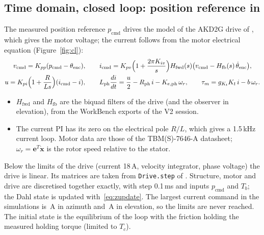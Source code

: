 \subsection{Time domain, closed loop: position reference in}\label{sec:cl}
The measured position reference $p_\mathrm{cmd}$ drives the model of the AKD2G drive of , which gives the motor voltage; the current follows from the motor electrical equation (Figure~\ref{fig:cl}):
\begin{gather}
v_\mathrm{cmd}=K_{pp}(p_\mathrm{cmd}-\theta_\mathrm{enc}),\qquad
i_\mathrm{cmd}=K_{pv}\Bigl(1+\frac{2\pi K_{iv}}{s}\Bigr)H_\mathrm{fwd}(s)\bigl(v_\mathrm{cmd}-H_\mathrm{fb}(s)\,\dot\theta_\mathrm{enc}\bigr),\\
u=K_{pi}\Bigl(1+\frac{R}{Ls}\Bigr)(i_\mathrm{cmd}-i),\qquad L_\mathrm{ph}\frac{di}{dt}=\frac u2-R_\mathrm{ph}\,i-K_{e,\mathrm{ph}}\,\omega_r,\qquad \tau_m=g_{K_t}K_t\,i-b\,\omega_r .\label{eq:drive}
\end{gather}
\begin{itemize}
\item $H_\mathrm{fwd}$ and $H_\mathrm{fb}$ are the biquad filters of the drive (and the observer in elevation), from the WorkBench exports of the V2 session.
\item The current PI has its zero on the electrical pole $R/L$, which gives a 1.5\,kHz current loop. Motor data are those of the TBM(S)-7646-A datasheet; $\omega_r=\mathbf e^T\dot{\mathbf x}$ is the rotor speed relative to the stator.
\end{itemize}
Below the limits of the drive (current 18\,A, velocity integrator, phase voltage) the drive is linear. Its matrices are taken from \texttt{Drive.step} of . Structure, motor and drive are discretised together exactly, with step 0.1\,ms and inputs $p_\mathrm{cmd}$ and $T_b$; the Dahl state is updated with~\eqref{eq:zupdate}. The largest current command in the simulations is \icmdMaxA\,A in azimuth and \icmdMaxP\,A in elevation, so the limits are never reached. The initial state is the equilibrium of the loop with the friction holding the measured holding torque (limited to $T_c$).


